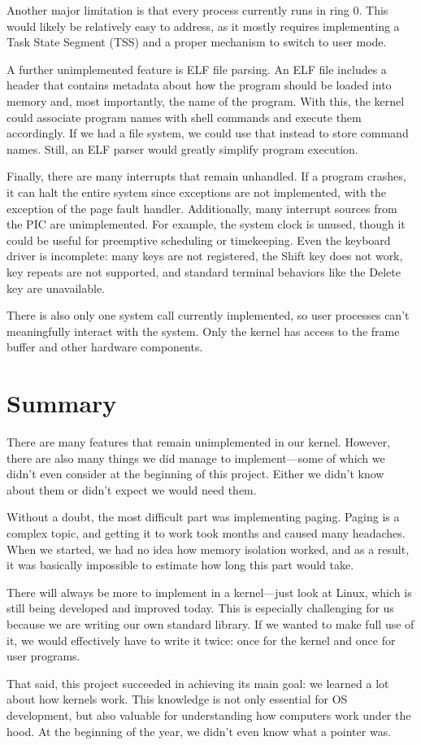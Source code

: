 \documentclass{article}
\begin{document}
Another major limitation is that every process currently runs in ring 0. This would likely be relatively easy to address, as it mostly requires implementing a Task State Segment (TSS) and a proper mechanism to switch to user mode.

A further unimplemented feature is ELF file parsing. An ELF file includes a header that contains metadata about how the program should be loaded into memory and, most importantly, the name of the program. With this, the kernel could associate program names with shell commands and execute them accordingly. If we had a file system, we could use that instead to store command names. Still, an ELF parser would greatly simplify program execution.

Finally, there are many interrupts that remain unhandled. If a program crashes, it can halt the entire system since exceptions are not implemented, with the exception of the page fault handler. Additionally, many interrupt sources from the PIC are unimplemented. For example, the system clock is unused, though it could be useful for preemptive scheduling or timekeeping. Even the keyboard driver is incomplete: many keys are not registered, the Shift key does not work, key repeats are not supported, and standard terminal behaviors like the Delete key are unavailable. 

There is also only one system call currently implemented, so user processes can't meaningfully interact with the system. Only the kernel has access to the frame buffer and other hardware components.

\section{Summary}

There are many features that remain unimplemented in our kernel. However, there are also many things we did manage to implement—some of which we didn't even consider at the beginning of this project. Either we didn't know about them or didn’t expect we would need them.

Without a doubt, the most difficult part was implementing paging. Paging is a complex topic, and getting it to work took months and caused many headaches. When we started, we had no idea how memory isolation worked, and as a result, it was basically impossible to estimate how long this part would take.

There will always be more to implement in a kernel—just look at Linux, which is still being developed and improved today. This is especially challenging for us because we are writing our own standard library. If we wanted to make full use of it, we would effectively have to write it twice: once for the kernel and once for user programs.

That said, this project succeeded in achieving its main goal: we learned a lot about how kernels work. This knowledge is not only essential for OS development, but also valuable for understanding how computers work under the hood. At the beginning of the year, we didn’t even know what a pointer was.
\end{document}
